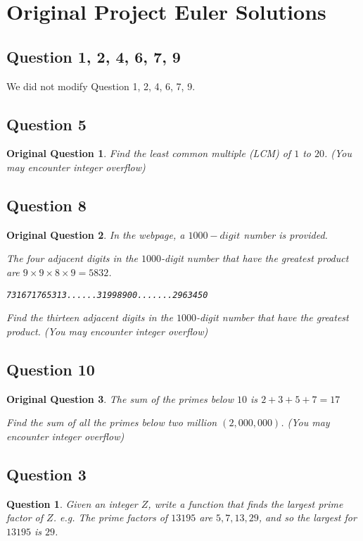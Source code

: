 \documentclass[12pt]{article}
\newtheorem*{question*}{Question}
\newtheorem*{origQuestion*}{Original Question}
\begin{document}
\pagebreak
\section{Original Project Euler Solutions}
\subsection*{Question 1, 2, 4, 6, 7, 9} 
We did not modify Question 1, 2, 4, 6, 7, 9.
\subsection*{Question 5} 
\begin{origQuestion*}
Find the least common multiple (LCM) of $1$ to $20$. (You may encounter integer overflow)
\end{origQuestion*}
\subsection*{Question 8} 
\begin{origQuestion*}
In the webpage, a $1000-digit$ number is provided.

The four adjacent digits in the $1000$-digit number that have the greatest product are $9 \times 9 \times 8 \times 9 = 5832$.
\begin{center}
\texttt{731671765313......31998900.......2963450}
\end{center}
Find the thirteen adjacent digits in the $1000$-digit number that have the greatest product. (You may encounter integer overflow)
\end{origQuestion*}
\subsection*{Question 10} 
\begin{origQuestion*}
The sum of the primes below $10$ is $2 + 3 + 5 + 7 = 17$

Find the sum of all the primes below two million $(2,000,000)$. (You may encounter integer overflow)
\end{origQuestion*}


\vfill
\pagebreak


\subsection*{Question 3} 
\begin{question*}
Given an integer $Z$, write a function that finds the largest prime factor of $Z$. e.g. The prime factors of $13195$ are $5, 7, 13, 29$, and so the largest for $13195$ is $29$.
\end{question*}
\end{document}
